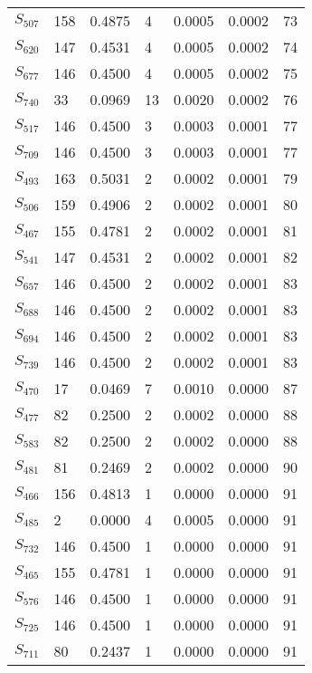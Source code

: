 \begin{xltabular}{\textwidth}{XXXXXXX}
  $S_{507}$ & 158 & 0.4875 & 4 & 0.0005 & 0.0002 & 73 \\ 
  $S_{620}$ & 147 & 0.4531 & 4 & 0.0005 & 0.0002 & 74 \\ 
  $S_{677}$ & 146 & 0.4500 & 4 & 0.0005 & 0.0002 & 75 \\ 
  $S_{740}$ & 33 & 0.0969 & 13 & 0.0020 & 0.0002 & 76 \\ 
  $S_{517}$ & 146 & 0.4500 & 3 & 0.0003 & 0.0001 & 77 \\ 
  $S_{709}$ & 146 & 0.4500 & 3 & 0.0003 & 0.0001 & 77 \\ 
  $S_{493}$ & 163 & 0.5031 & 2 & 0.0002 & 0.0001 & 79 \\ 
  $S_{506}$ & 159 & 0.4906 & 2 & 0.0002 & 0.0001 & 80 \\ 
  $S_{467}$ & 155 & 0.4781 & 2 & 0.0002 & 0.0001 & 81 \\ 
  $S_{541}$ & 147 & 0.4531 & 2 & 0.0002 & 0.0001 & 82 \\ 
  $S_{657}$ & 146 & 0.4500 & 2 & 0.0002 & 0.0001 & 83 \\ 
  $S_{688}$ & 146 & 0.4500 & 2 & 0.0002 & 0.0001 & 83 \\ 
  $S_{694}$ & 146 & 0.4500 & 2 & 0.0002 & 0.0001 & 83 \\ 
  $S_{739}$ & 146 & 0.4500 & 2 & 0.0002 & 0.0001 & 83 \\ 
  $S_{470}$ & 17 & 0.0469 & 7 & 0.0010 & 0.0000 & 87 \\ 
  $S_{477}$ & 82 & 0.2500 & 2 & 0.0002 & 0.0000 & 88 \\ 
  $S_{583}$ & 82 & 0.2500 & 2 & 0.0002 & 0.0000 & 88 \\ 
  $S_{481}$ & 81 & 0.2469 & 2 & 0.0002 & 0.0000 & 90 \\ 
  $S_{466}$ & 156 & 0.4813 & 1 & 0.0000 & 0.0000 & 91 \\ 
  $S_{485}$ & 2 & 0.0000 & 4 & 0.0005 & 0.0000 & 91 \\ 
  $S_{732}$ & 146 & 0.4500 & 1 & 0.0000 & 0.0000 & 91 \\ 
  $S_{465}$ & 155 & 0.4781 & 1 & 0.0000 & 0.0000 & 91 \\ 
  $S_{576}$ & 146 & 0.4500 & 1 & 0.0000 & 0.0000 & 91 \\ 
  $S_{725}$ & 146 & 0.4500 & 1 & 0.0000 & 0.0000 & 91 \\ 
  $S_{711}$ & 80 & 0.2437 & 1 & 0.0000 & 0.0000 & 91 \\ 

\end{xltabular}
